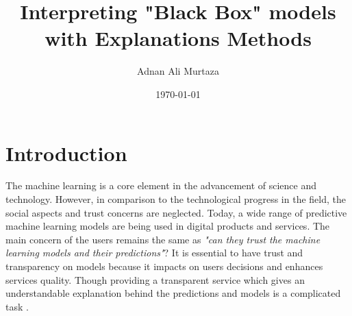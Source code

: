 \documentclass[english]{tktltiki2}
\title{Interpreting "Black Box" models with Explanations Methods}
\author{Adnan Ali Murtaza}
\date{\today}
\theoremstyle{definition}
\theoremstyle{remark}
\begin{document}

\frontmatter      %

\maketitle        %
\makeabstract     %

\tableofcontents  %

\mainmatter       %
\section{Introduction} %

%	
%
%

The machine learning is a core element in the advancement of science and technology. However, in comparison to the technological progress in the field, the social aspects and trust concerns are neglected. Today, a wide range of predictive machine learning models are being used in digital products and services. The main concern of the users remains the same as \textit{"can they trust the machine learning models and their predictions"}? It is essential to have trust and transparency on models because it impacts on users decisions and enhances services quality. Though providing a transparent service which gives an understandable explanation behind the predictions and models is a complicated task  \citep{lipton2016mythos}.
\end{document}
